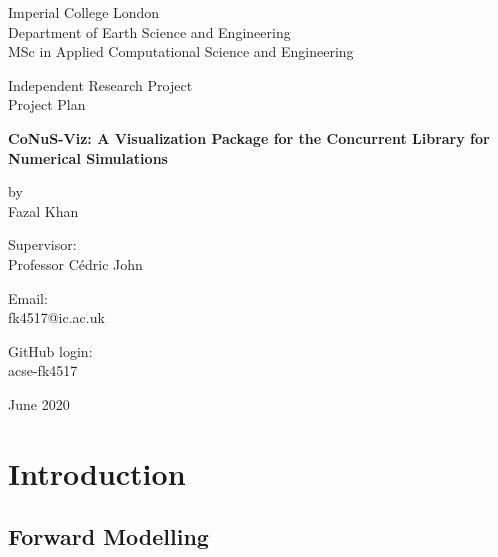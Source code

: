 \documentclass[12pt]{article}
\begin{document}
\begin{titlepage}
	\begin{center}
		\vspace*{1cm}
		
		Imperial College London \\
		Department of Earth Science and Engineering \\
		MSc in Applied Computational Science and Engineering
		
		\vspace{1cm}
		
		Independent Research Project \\
		Project Plan
		
		
		\vspace{1cm}
		
		
		{\fontsize{18}{104}\selectfont \textbf{ CoNuS-Viz: A Visualization Package for the Concurrent Library for Numerical Simulations}}

		
		\vspace{1cm}
		
		by \\ 
		Fazal Khan
		
		\vspace{1cm}
		
		Supervisor: \\
		Professor Cédric John
		
		\vspace{1cm}
		
		Email: \\
		fk4517@ic.ac.uk
		
		\vspace{1cm}
		
		GitHub login: \\
		acse-fk4517
		
		\vspace{1.0cm}
		
		June 2020
		
	\end{center}
\end{titlepage}	
\section{Introduction}

\subsection{Forward Modelling}
\end{document}

